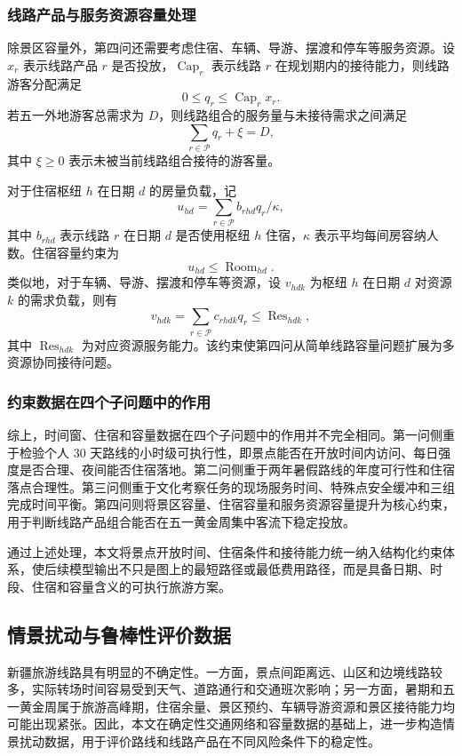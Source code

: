 \documentclass[UTF8,zihao=-4,a4paper]{ctexart}
\begin{document}
\subsubsection{线路产品与服务资源容量处理}

除景区容量外，第四问还需要考虑住宿、车辆、导游、摆渡和停车等服务资源。设 $x_r$ 表示线路产品 $r$ 是否投放，$\operatorname{Cap}_{r}$ 表示线路 $r$ 在规划期内的接待能力，则线路游客分配满足
\[
0\leq q_r \leq \operatorname{Cap}_{r}x_r.
\]
若五一外地游客总需求为 $D$，则线路组合的服务量与未接待需求之间满足
\[
\sum_{r\in\mathcal{P}} q_r + \xi = D,
\]
其中 $\xi\geq 0$ 表示未被当前线路组合接待的游客量。

对于住宿枢纽 $h$ 在日期 $d$ 的房量负载，记
\[
u_{hd}
=
\sum_{r\in\mathcal{P}} b_{rhd} q_r /\kappa,
\]
其中 $b_{rhd}$ 表示线路 $r$ 在日期 $d$ 是否使用枢纽 $h$ 住宿，$\kappa$ 表示平均每间房容纳人数。住宿容量约束为
\[
u_{hd}\leq \operatorname{Room}_{hd}.
\]
类似地，对于车辆、导游、摆渡和停车等资源，设 $v_{hdk}$ 为枢纽 $h$ 在日期 $d$ 对资源 $k$ 的需求负载，则有
\[
v_{hdk}
=
\sum_{r\in\mathcal{P}} c_{rhdk} q_r
\leq
\operatorname{Res}_{hdk},
\]
其中 $\operatorname{Res}_{hdk}$ 为对应资源服务能力。该约束使第四问从简单线路容量问题扩展为多资源协同接待问题。

\subsubsection{约束数据在四个子问题中的作用}

综上，时间窗、住宿和容量数据在四个子问题中的作用并不完全相同。第一问侧重于检验个人 $30$ 天路线的小时级可执行性，即景点能否在开放时间内访问、每日强度是否合理、夜间能否住宿落地。第二问侧重于两年暑假路线的年度可行性和住宿落点合理性。第三问侧重于文化考察任务的现场服务时间、特殊点安全缓冲和三组完成时间平衡。第四问则将景区容量、住宿容量和服务资源容量提升为核心约束，用于判断线路产品组合能否在五一黄金周集中客流下稳定投放。

通过上述处理，本文将景点开放时间、住宿条件和接待能力统一纳入结构化约束体系，使后续模型输出不只是图上的最短路径或最低费用路径，而是具备日期、时段、住宿和容量含义的可执行旅游方案。

\subsection{情景扰动与鲁棒性评价数据}
\label{subsec:scenario_robustness_data}

新疆旅游线路具有明显的不确定性。一方面，景点间距离远、山区和边境线路较多，实际转场时间容易受到天气、道路通行和交通班次影响；另一方面，暑期和五一黄金周属于旅游高峰期，住宿余量、景区预约、车辆导游资源和景区接待能力均可能出现紧张。因此，本文在确定性交通网络和容量数据的基础上，进一步构造情景扰动数据，用于评价路线和线路产品在不同风险条件下的稳定性。
\end{document}

